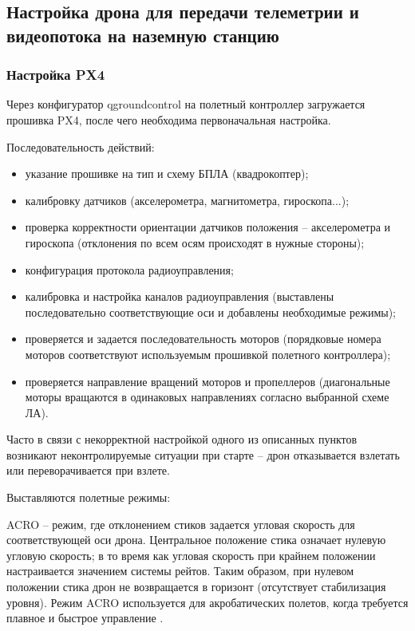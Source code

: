 \subsection{Настройка дрона для передачи телеметрии и видеопотока на наземную станцию}


\subsubsection{Настройка PX4}
Через конфигуратор qgroundcontrol на полетный контроллер загружается прошивка PX4, после чего необходима первоначальная настройка.

Последовательность действий:
\begin{itemize}
	\item указание прошивке на тип и схему БПЛА (квадрокоптер);
	\item калибровку датчиков (акселерометра, магнитометра, гироскопа...);
	\item проверка корректности ориентации датчиков положения -- акселерометра и гироскопа (отклонения по всем осям происходят в нужные стороны);
	\item конфигурация протокола радиоуправления;
	\item калибровка и настройка каналов радиоуправления (выставлены последовательно соответствующие оси и добавлены необходимые режимы);
	\item проверяется и задается последовательность моторов (порядковые номера моторов соответствуют используемым прошивкой полетного контроллера);
	\item проверяется направление вращений моторов и пропеллеров (диагональные моторы вращаются в одинаковых направлениях согласно выбранной схеме ЛА).
\end{itemize}

Часто в связи с некорректной настройкой одного из описанных пунктов возникают неконтролируемые ситуации при старте -- дрон отказывается взлетать или переворачивается при взлете.

Выставляются полетные режимы:

ACRO -- режим, где отклонением стиков задается угловая скорость для соответствующей оси дрона. Центральное положение стика означает нулевую угловую скорость; в то время как угловая скорость при крайнем положении настраивается значением системы рейтов. Таким образом, при нулевом положении стика дрон не возвращается в горизонт (отсутствует стабилизация уровня). Режим ACRO используется для акробатических полетов, когда требуется плавное и быстрое управление \cite{ardupilot}.

